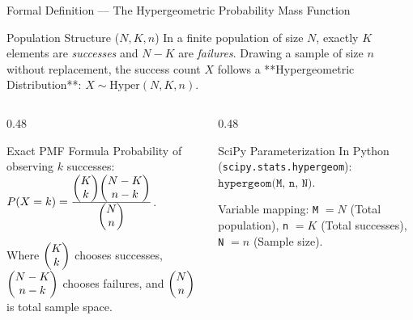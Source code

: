 \documentclass[aspectratio=169,xcolor={dvipsnames,table}]{beamer}
\begin{document}
\begin{frame}{Formal Definition --- The Hypergeometric Probability Mass Function}
	\vspace{-0.2cm}
	\begin{block}{Population Structure ($N, K, n$)}
		\scriptsize
		In a finite population of size $N$, exactly $K$ elements are \emph{successes} and $N-K$ are \emph{failures}. Drawing a sample of size $n$ without replacement, the success count $X$ follows a **Hypergeometric Distribution**: $X \sim \text{Hyper}(N, K, n)$.
	\end{block}
	\vspace{-0.25cm}
	\begin{columns}[T]
		\begin{column}{0.48\textwidth}
			\begin{exampleblock}{Exact PMF Formula}
				\scriptsize
				Probability of observing $k$ successes:
				$P(X = k) = \frac{\begin{pmatrix} K \\ k \end{pmatrix}\begin{pmatrix} N-K \\ n-k \end{pmatrix}}{\begin{pmatrix} N \\ n \end{pmatrix}}$.
				
				Where $\begin{pmatrix} K \\ k \end{pmatrix}$ chooses successes, $\begin{pmatrix} N-K \\ n-k \end{pmatrix}$ chooses failures, and $\begin{pmatrix} N \\ n \end{pmatrix}$ is total sample space.
			\end{exampleblock}
		\end{column}
		\begin{column}{0.48\textwidth}
			\begin{alertblock}{SciPy Parameterization}
				\scriptsize
				In Python (\texttt{scipy.stats.hypergeom}):
				$\texttt{hypergeom(M, n, N)}$.
				
				Variable mapping:
				\texttt{M} $= N$ (Total population),
				\texttt{n} $= K$ (Total successes),
				\texttt{N} $= n$ (Sample size).
			\end{alertblock}
		\end{column}
	\end{columns}
\end{frame}
\end{document}
